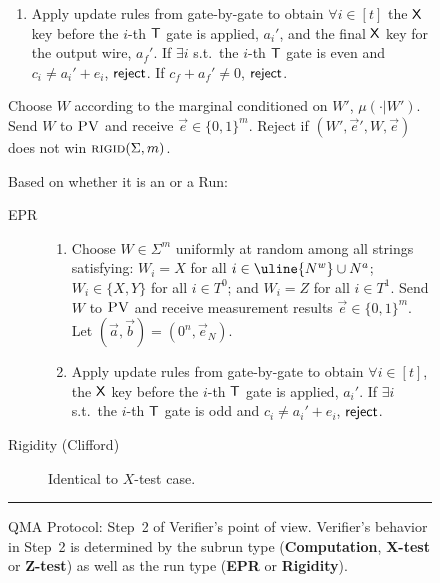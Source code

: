 \documentclass{toc}
\newcommand{\rigid}{\textsc{rigid}}
\newcommand{\pv}{\textsc{PV}}
\newcommand{\highlight}[1]{\uline{#1}}
\begin{document}
\begin{figure}[H]
\begin{description}
\begin{description}
\begin{enumerate}
		\item[(ii)] Apply update rules from  gate-by-gate to obtain $\forall i\in [t]$ the $\sf X$ key before the $i$-th $\sf T$ gate is applied, $a_i'$, and the final $\sf X$ key for the output wire, $a_f'$. 
If $\exists i$ s.t.\ the $i$-th $\sf T$ gate is even and $c_i\neq a_i'+e_i$, $\sf reject$. If $c_f+a_f'\neq 0$, $\sf reject$. 
	\end{enumerate}
	\item[Rigidity (Clifford)] Choose ${W}$ according to the marginal conditioned on ${W}'$, $\mu(\cdot|{W}')$. 
	Send ${W}$ to $\pv$ and receive $\vec{e}\in\{0,1\}^m$. Reject if   $({W}',\vec{e}',{W},\vec{e})$ does not win $\rigid(\Sigma,m)$. 
\end{description}

\item[$Z$-test] Based on whether it is 
an  or a  Run:
\begin{description}
	\item[EPR] 
	\begin{enumerate}
		\item[(i)] Choose $W\in\Sigma^m$ uniformly at random among all strings
      satisfying: $W_i=X$ for all $i\in \highlight{N^w} \cup N^a$; $W_i\in\{X,Y\}$ for all $i\in T^0$; and $W_i=Z$ for all $i\in T^1$. Send $W$ to $\pv$ and receive measurement results $\vec{e}\in\{0,1\}^m$. Let $(\vec{a},\vec{b})=(0^n,\vec{e}_N)$.
		\item[(ii)] Apply update rules from  gate-by-gate to obtain $\forall i\in [t]$, the $\sf X$ key before the $i$-th $\sf T$ gate is applied, $a_i'$. 
If $\exists i$ s.t.\ the $i$-th $\sf T$ gate is odd and $c_i\neq a_i'+e_i$, $\sf reject$. 
	\end{enumerate}
	\item[Rigidity (Clifford)] Identical to $X$-test case.
\end{description}
\end{description}
\rule[2ex]{\textwidth}{0.5pt}\vspace{-.5cm}
\caption{QMA Protocol: Step~2 of Verifier's point of view. Verifier's behavior in Step~2 is determined by the subrun type (\textbf{Computation}, \textbf{X-test} or \textbf{Z-test}) as well as the run type (\textbf{EPR} or \textbf{Rigidity}).}\label{fig:qma-protocol-V-continued}
\end{figure}
\end{document}
